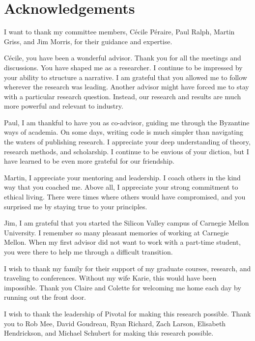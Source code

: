 \documentclass[oneside,letterpaper]{memoir}
\begin{document}
\frontmatter

\thetitlepage
\copyrightpage

\section*{Acknowledgements}
I want to thank my committee members, C\'ecile P\'eraire, Paul Ralph, Martin Griss, and Jim Morris, for their guidance and expertise.

C\'ecile, you have been a wonderful advisor. Thank you for all the meetings and discussions. You have shaped me as a researcher. I continue to be impressed by your ability to structure a narrative. I am grateful that you allowed me to follow wherever the research was leading. Another advisor might have forced me to stay with a particular research question. Instead, our research and results are much more powerful and relevant to industry. 

Paul, I am thankful to have you as co-advisor, guiding me through the Byzantine ways of academia. On some days, writing code is much simpler than navigating the waters of publishing research. I appreciate your deep understanding of theory, research methods, and scholarship. I continue to be envious of your diction, but I have learned to be even more grateful for our friendship. 

Martin, I appreciate your mentoring and leadership. I coach others in the kind way that you coached me. Above all, I appreciate your strong commitment to ethical living. There were times where others would have compromised, and you surprised me by staying true to your principles.

Jim, I am grateful that you started the Silicon Valley campus of Carnegie Mellon University. I remember so many pleasant memories of working at Carnegie Mellon. When my first advisor did not want to work with a part-time student, you were there to help me through a difficult transition.

I wish to thank my family for their support of my graduate courses, research, and traveling to conferences. Without my wife Karie, this would have been impossible. Thank you Claire and Colette for welcoming me home each day by running out the front door. 

I wish to thank the leadership of Pivotal for making this research possible. Thank you to Rob Mee, David Goudreau, Ryan Richard, Zach Larson, Elisabeth Hendrickson, and Michael Schubert for making this research possible.
\end{document}

